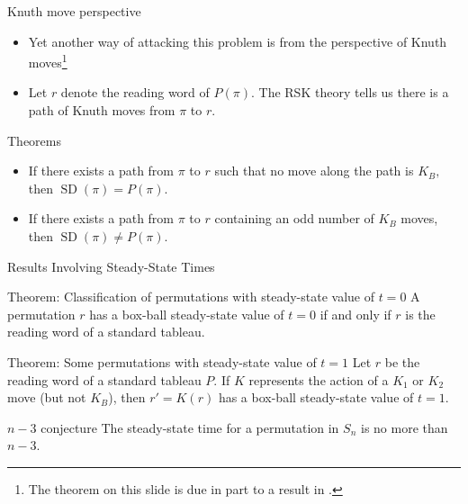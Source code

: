 \documentclass[aspectratio=169, serif]{beamer}
\DeclareMathOperator{\SD}{SD}
\begin{document}
\begin{frame}{Knuth move perspective}
    \begin{itemize}
            \item Yet another way of attacking this problem is from the perspective of Knuth moves\footnote[frame]{The theorem on this slide is due in part to a result in \cite{LLPS19}.}
            \item Let $r$ denote the reading word of $P(\pi).$ The RSK theory tells us there is a path of Knuth moves from $\pi$ to $r.$
        \end{itemize}
        \begin{alertblock}{Theorems}
        \begin{itemize}
            \item If there exists a path from $\pi$ to $r$ such that no move along the path is $K_B,$ then $\SD(\pi)=P(\pi).$
            \item If there exists a path from $\pi$ to $r$ containing an odd number of $K_B$ moves, then $\SD(\pi)\neq P(\pi).$
        \end{itemize}
    \end{alertblock}
    
\end{frame}
\begin{frame}{Results Involving Steady-State Times}
    \begin{alertblock}{Theorem: Classification of permutations with steady-state value of $t=0$}
    A permutation $r$ has a box-ball steady-state value of $t=0$ if and only if $r$ is the reading word of a standard tableau.
    \end{alertblock}
    \begin{alertblock}{Theorem: Some permutations with steady-state value of $t=1$}
     Let $r$ be the reading word of a standard tableau $P$. If $K$ represents the action of a $K_1$ or $K_2$ move (but not $K_B$), then $r'=K(r)$ has a box-ball steady-state value of $t=1.$
    \end{alertblock}
    \small
    \begin{block}{$n-3$ conjecture}
        The steady-state time for a permutation in $S_n$ is no more than $n-3.$
    \end{block}
\end{frame}
\end{document}
